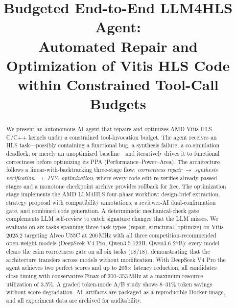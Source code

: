 \documentclass[10pt,conference,letterpaper]{IEEEtran}
\begin{document}
\title{Budgeted End-to-End LLM4HLS Agent: \\
Automated Repair and Optimization of Vitis HLS Code \\
within Constrained Tool-Call Budgets}

\author{
}

\maketitle

\begin{abstract}
We present an autonomous AI agent that repairs and optimizes AMD Vitis HLS C/C++ kernels under a constrained tool-invocation budget. The agent receives an HLS task---possibly containing a functional bug, a synthesis failure, a co-simulation deadlock, or merely an unoptimized baseline---and iteratively drives it to functional correctness before optimizing its PPA (Performance--Power--Area). The architecture follows a linear-with-backtracking three-stage flow: \emph{correctness repair} $\rightarrow$ \emph{synthesis verification} $\rightarrow$ \emph{PPA optimization}, where every code edit re-verifies already-passed stages and a monotone checkpoint archive provides rollback for free. The optimization stage implements the AMD LLM4HLS four-phase workflow: design-brief extraction, strategy proposal with compatibility annotations, a reviewer-AI dual-confirmation gate, and combined code generation. A deterministic mechanical-check gate complements LLM self-review to catch signature changes that the LLM misses. We evaluate on six tasks spanning three task types (repair, structural, optimize) on Vitis 2025.2 targeting Alveo U55C at 200\,MHz with all three competition-recommended open-weight models (DeepSeek V4 Pro, Qwen3.5 122B, Qwen3.6 27B): every model clears the csim correctness gate on all six tasks (18/18), demonstrating that the architecture transfers across models without modification. With DeepSeek V4 Pro the agent achieves two perfect scores and up to 205$\times$ latency reduction; all candidates close timing with conservative Fmax of 200--353\,MHz at a maximum resource utilization of 3.5\%. A graded token-mode A/B study shows 8--31\% token savings without score degradation. All artifacts are packaged as a reproducible Docker image, and all experiment data are archived for auditability.
\end{abstract}
\end{document}
